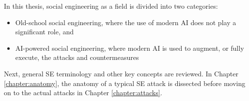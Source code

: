 
In this thesis, social engineering as a field is divided into two categories:

\begin{itemize}
    \item Old-school social engineering, where the use of modern AI does not play a significant role, and
    \item AI-powered social engineering, where modern AI is used to augment, or fully execute, the attacks and countermeasures
\end{itemize}

Next, general SE terminology and other key concepts are reviewed. In Chapter \ref{chapter:anatomy}, the anatomy of a typical SE attack is dissected before moving on to the actual attacks in Chapter \ref{chapter:attacks}.








